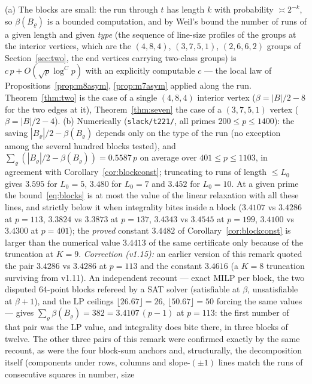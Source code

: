\begin{remark}\label{rem:blocks}
(a) The blocks are small: the run through $t$ has length $k$ with probability $\asymp2^{-k}$, so $\beta(B_\varrho)$ is a bounded computation,
and by Weil's bound the number of runs of a given length and given \emph{type} (the sequence of line-size profiles of the groups at the
interior vertices, which are the $(4,8,4)$, $(3,7,5,1)$, $(2,6,6,2)$ groups of Section~\ref{sec:two}, the end vertices carrying two-class
groups) is $c\,p+O(\sqrt p\log^Cp)$ with an explicitly computable $c$ --- the local law of Propositions~\ref{prop:m8asym},
\ref{prop:m7asym} applied along the run.  Theorem~\ref{thm:two} is the case of a single $(4,8,4)$ interior vertex ($\beta=|B|/2-8$ for the
two edges at it), Theorem~\ref{thm:seven} the case of a $(3,7,5,1)$ vertex ($\beta=|B|/2-4$).
(b) Numerically (\texttt{slack/t221/}, all primes $200\le p\le1400$): the saving $|B_\varrho|/2-\beta(B_\varrho)$ depends only on the type of the run
(no exception among the several hundred blocks tested), and $\sum_\varrho(|B_\varrho|/2-\beta(B_\varrho))=0.5587\,p$ on average over
$401\le p\le1103$, in agreement with Corollary~\ref{cor:blockconst}; truncating to runs of length $\le L_0$ gives
$3.595$ for $L_0=5$, $3.480$ for $L_0=7$ and $3.452$ for $L_0=10$.  At a given prime the bound~\eqref{eq:blocks} is at most the value of the linear relaxation with
all these lines, and strictly below it when integrality bites inside a block ($3.4107$ vs $3.4286$ at $p=113$, $3.3824$ vs $3.3873$ at
$p=137$, $3.4343$ vs $3.4545$ at $p=199$, $3.4100$ vs $3.4300$ at $p=401$); the \emph{proved} constant $3.4482$ of
Corollary~\ref{cor:blockconst} is larger than the numerical value $3.4413$ of the same certificate only because of the truncation at $K=9$.
\emph{Correction (v1.15):} an earlier version of this remark quoted the pair $3.4286$ vs $3.4286$ at $p=113$ and
the constant $3.4616$ (a $K=8$ truncation surviving from v1.11).  An independent recount --- exact MILP per block,
the two disputed $64$-point blocks refereed by a SAT solver (satisfiable at $\beta$, unsatisfiable at $\beta+1$),
and the LP ceilings $\lfloor26.67\rfloor=26$, $\lfloor50.67\rfloor=50$ forcing the same values --- gives
$\sum_\varrho\beta(B_\varrho)=382=3.4107\,(p-1)$ at $p=113$: the first number of that pair was the LP value, and
integrality does bite there, in three blocks of twelve.  The other three pairs of this remark were confirmed
exactly by the same recount, as were the four block-sum anchors and, structurally, the decomposition itself
(components under rows, columns and slope-$(\pm1)$ lines match the runs of consecutive squares in number, size

\end{remark}
